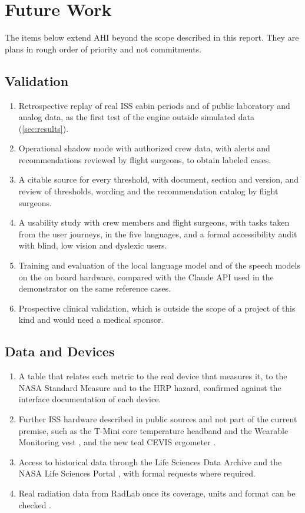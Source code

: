 \section{Future Work}
\label{sec:future-work}

The items below extend AHI beyond the scope described in this report. They are plans in rough order of priority and not commitments.

\subsection{Validation}
\label{subsec:future-validation}

\begin{enumerate}
\item Retrospective replay of real ISS cabin periods and of public laboratory and analog data, as the first test of the engine outside simulated data (\ref{sec:results}).
\item Operational shadow mode with authorized crew data, with alerts and recommendations reviewed by flight surgeons, to obtain labeled cases.
\item A citable source for every threshold, with document, section and version, and review of thresholds, wording and the recommendation catalog by flight surgeons.
\item A usability study with crew members and flight surgeons, with tasks taken from the user journeys, in the five languages, and a formal accessibility audit with blind, low vision and dyslexic users.
\item Training and evaluation of the local language model and of the speech models on the on board hardware, compared with the Claude API used in the demonstrator on the same reference cases.
\item Prospective clinical validation, which is outside the scope of a project of this kind and would need a medical sponsor.
\end{enumerate}

\subsection{Data and Devices}
\label{subsec:future-real-data}

\begin{enumerate}
\item A table that relates each metric to the real device that measures it, to the NASA Standard Measure and to the HRP hazard, confirmed against the interface documentation of each device.
\item Further ISS hardware described in public sources and not part of the current premise, such as the T-Mini core temperature headband and the Wearable Monitoring vest \cite{nasa_wearable_tech_iss}, and the new teal CEVIS ergometer \cite{nasa_jsc_exercise_countermeasures}.
\item Access to historical data through the Life Sciences Data Archive and the NASA Life Sciences Portal \cite{nasa_lsda,nasa_nlsp}, with formal requests where required.
\item Real radiation data from RadLab once its coverage, units and format can be checked \cite{osdr_radlab}.
\end{enumerate}

